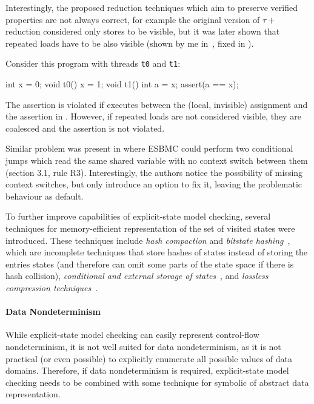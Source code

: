 Interestingly, the proposed reduction techniques which aim to preserve verified
properties are not always correct, for example the original version of $\tau+$
reduction considered only stores to be visible, but it was later shown that
repeated loads have to be also visible (shown by me in~, fixed in
).\begin{marginnote}%
Consider this program with threads \texttt{t0} and \texttt{t1}:

\begin{cppcode}
  int x = 0;
  void t0() {
    x = 1;
  }
  void t1() {
    int a = x;
    assert(a == x);
  }
\end{cppcode}

The assertion is violated if  executes between the (local, invisible)
assignment and the assertion in .
However, if repeated loads are not considered visible, they are coalesced and
the assertion is not violated.
\end{marginnote}
%
Similar problem was present in  where ESBMC could perform two conditional jumps which read the same shared variable with no context switch between them (section 3.1, rule R3).
Interestingly, the authors notice the possibility of missing context switches, but only introduce an option to fix it, leaving the problematic behaviour as default.

To further improve capabilities of explicit-state model checking, several
techniques for memory-efficient representation of the set of visited states
were introduced.
These techniques include \emph{hash compaction} and \emph{bitstate
hashing}~, which are incomplete techniques that store
hashes of states instead of storing the entries states (and therefore can omit
some parts of the state space if there is hash collision),
\emph{conditional and external storage of states}~, and
\emph{lossless compression techniques}~.

\paragraph{Data Nondeterminism}
While explicit-state model checking can easily represent control-flow
nondeterminism, it is not well suited for data nondeterminism, as it is not
practical (or even possible) to explicitly enumerate all possible values of
data domains.
Therefore, if data nondeterminism is required, explicit-state model checking
needs to be combined with some technique for symbolic of abstract data
representation.


